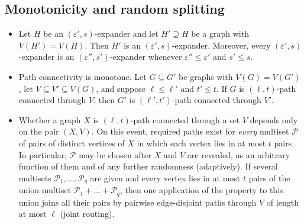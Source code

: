 \subsection{Monotonicity and random splitting}

\begin{lemma}\label{s3:lemMonotone}
\begin{itemize}
\item[(i)] Let $H$ be an $(\varepsilon',s)$-expander and let $H'\supseteq
  H$ be a graph with $V(H')=V(H)$. Then $H'$ is an
  $(\varepsilon',s)$-expander. Moreover, every $(\varepsilon',s)$-expander
  is an $(\varepsilon'',s')$-expander whenever $\varepsilon''\le
  \varepsilon'$ and $s'\le s$.
\item[(ii)] Path connectivity is monotone. Let $G\subseteq G'$ be graphs
  with $V(G)=V(G')$, let $V\subseteq V'\subseteq V(G)$, and suppose
  $\ell\le\ell'$ and $t'\le t$. If $G$ is $(\ell,t)$-path connected
  through $V$, then $G'$ is $(\ell',t')$-path connected through $V'$.
\item[(iii)] Whether a graph $X$ is $(\ell,t)$-path connected through a
  set $V$ depends only on the pair $(X,V)$. On this event, required paths
  exist for \emph{every} multiset $\mathcal P$ of pairs of distinct
  vertices of $X$ in which each vertex lies in at most $t$ pairs. In
  particular, $\mathcal P$ may be chosen after $X$ and $V$ are revealed,
  as an arbitrary function of them and of any further randomness
  (adaptively). If several multisets $\mathcal P_1,\dots,\mathcal P_q$ are
  given and every vertex lies in at most $t$ pairs of the union multiset
  $\mathcal P_1+\dots+\mathcal P_q$, then one application of the property
  to this union joins all their pairs by pairwise edge-disjoint paths
  through $V$ of length at most $\ell$ (joint routing).
\end{itemize}
\deps{\ref{s1:citDef7}, \ref{s1:citDef11}}
\end{lemma}

